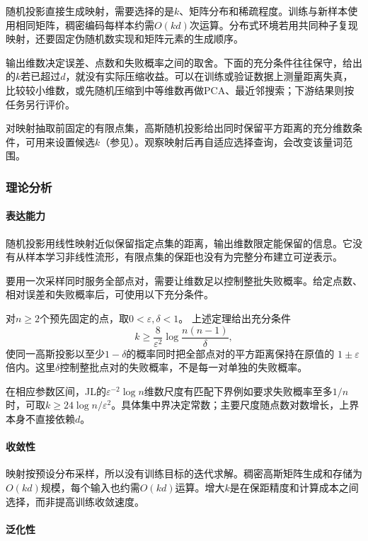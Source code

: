 随机投影直接生成映射，需要选择的是$k$、矩阵分布和稀疏程度。训练与新样本使用相同矩阵，稠密编码每样本约需$O(kd)$次运算。分布式环境若用共同种子复现映射，还要固定伪随机数实现和矩阵元素的生成顺序。

输出维数决定误差、点数和失败概率之间的取舍。下面的充分条件往往保守，给出的$k$若已超过$d$，就没有实际压缩收益。可以在训练或验证数据上测量距离失真，比较较小维数，或先随机压缩到中等维数再做PCA、最近邻搜索；下游结果则按任务另行评价。

对映射抽取前固定的有限点集，高斯随机投影给出同时保留平方距离的充分维数条件，可用来设置候选$k$（参见）。观察映射后再自适应选择查询，会改变该量词范围。

\subsubsection{理论分析}
\label{sec:dim-rp-theory}

\paragraph{表达能力}
随机投影用线性映射近似保留指定点集的距离，输出维数限定能保留的信息。它没有从样本学习非线性流形，有限点集的保距也没有为完整分布建立可逆表示。

要用一次采样同时服务全部点对，需要让维数足以控制整批失败概率。给定点数、相对误差和失败概率后，可使用以下充分条件。

对$n\geq2$个预先固定的点，取$0<\varepsilon,\delta<1$。
上述定理给出充分条件
\[
  k\geq\frac{8}{\varepsilon^2}\log\frac{n(n-1)}{\delta},
\]
使同一高斯投影以至少$1-\delta$的概率同时把全部点对的平方距离保持在原值的
$1\pm\varepsilon$倍内。这里$\delta$控制整批点对的失败概率，不是每一对单独的失败概率。

在相应参数区间，JL的$\varepsilon^{-2}\log n$维数尺度有匹配下界例如要求失败概率至多$1/n$时，可取$k\geq24\log n/\varepsilon^2$。具体集中界决定常数；主要尺度随点数对数增长，上界本身不直接依赖$d$。

\paragraph{收敛性}
映射按预设分布采样，所以没有训练目标的迭代求解。稠密高斯矩阵生成和存储为$O(kd)$规模，每个输入也约需$O(kd)$运算。增大$k$是在保距精度和计算成本之间选择，而非提高训练收敛速度。

\paragraph{泛化性}

